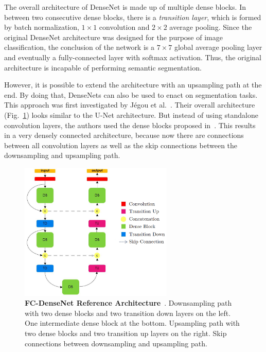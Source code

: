The overall architecture of DenseNet is made up of multiple dense blocks. In between two consecutive dense blocks, there is a \emph{transition layer}, which is formed by batch normalization, $1\times 1$ convolution and $2\times 2$ average pooling. Since the original DenseNet architecture was designed for the purpose of image classification, the conclusion of the network is a $7\times 7$ global average pooling layer and eventually a fully-connected layer with softmax activation. Thus, the original architecture is incapable of performing semantic segmentation.

However, it is possible to extend the architecture with an upsampling path at the end. By doing that, DenseNets can also be used to enact on segmentation tasks. This approach was first investigated by Jégou et al.~\cite{denseseg17}. Their overall architecture (Fig.~\ref{fig:densenet_segmentation}) looks similar to the U-Net architecture. But instead of using standalone convolution layers, the authors used the dense blocks proposed in~\cite{densenet17}. This results in a very densely connected architecture, because now there are connections between all convolution layers as well as the skip connections between the downsampling and upsampling path.

\begin{figure}[h]
    \centering
    \includegraphics[width=0.65\textwidth]{images/dense_segmentation_architecture}
    \caption[FC-DenseNet Reference Architecture]
    {\textbf{FC-DenseNet Reference Architecture}~\cite{denseseg17}. Downsampling path with two dense blocks and two transition down layers on the left. One intermediate dense block at the bottom. Upsampling path with two dense blocks and two transition up layers on the right. Skip connections between downsampling and upsampling path.}
    \label{fig:densenet_segmentation}
\end{figure}

